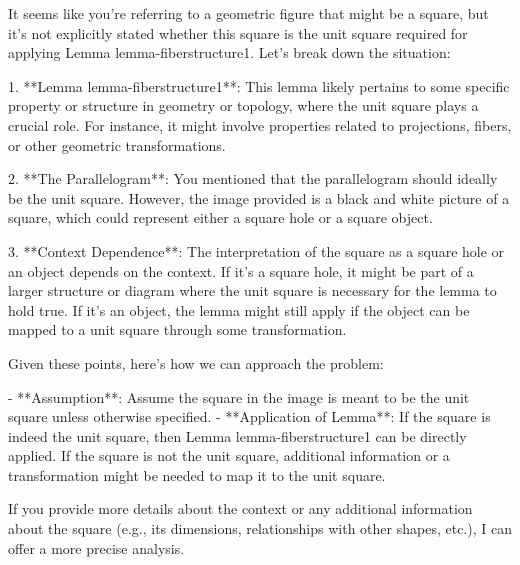 It seems like you're referring to a geometric figure that might be a square, but it's not explicitly stated whether this square is the unit square required for applying Lemma lemma-fiberstructure1. Let's break down the situation:

1. **Lemma lemma-fiberstructure1**: This lemma likely pertains to some specific property or structure in geometry or topology, where the unit square plays a crucial role. For instance, it might involve properties related to projections, fibers, or other geometric transformations.

2. **The Parallelogram**: You mentioned that the parallelogram should ideally be the unit square. However, the image provided is a black and white picture of a square, which could represent either a square hole or a square object.

3. **Context Dependence**: The interpretation of the square as a square hole or an object depends on the context. If it's a square hole, it might be part of a larger structure or diagram where the unit square is necessary for the lemma to hold true. If it's an object, the lemma might still apply if the object can be mapped to a unit square through some transformation.

Given these points, here’s how we can approach the problem:

- **Assumption**: Assume the square in the image is meant to be the unit square unless otherwise specified.
- **Application of Lemma**: If the square is indeed the unit square, then Lemma lemma-fiberstructure1 can be directly applied. If the square is not the unit square, additional information or a transformation might be needed to map it to the unit square.

If you provide more details about the context or any additional information about the square (e.g., its dimensions, relationships with other shapes, etc.), I can offer a more precise analysis.